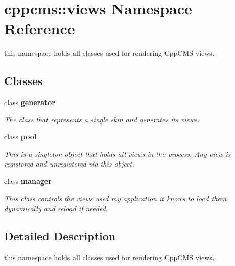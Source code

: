 \section{cppcms\-:\-:views \-Namespace \-Reference}
\label{namespacecppcms_1_1views}


this namespace holds all classes used for rendering \-Cpp\-C\-M\-S views.  


\subsection*{\-Classes}
\begin{DoxyCompactItemize}
\item 
class {\bf generator}
\begin{DoxyCompactList}\small\item\em \-The class that represents a single skin and generates its views. \end{DoxyCompactList}\item 
class {\bf pool}
\begin{DoxyCompactList}\small\item\em \-This is a singleton object that holds all views in the process. \-Any view is registered and unregistered via this object. \end{DoxyCompactList}\item 
class {\bf manager}
\begin{DoxyCompactList}\small\item\em \-This class controls the views used my application it knows to load them dynamically and reload if needed. \end{DoxyCompactList}\end{DoxyCompactItemize}


\subsection{\-Detailed \-Description}
this namespace holds all classes used for rendering \-Cpp\-C\-M\-S views. 